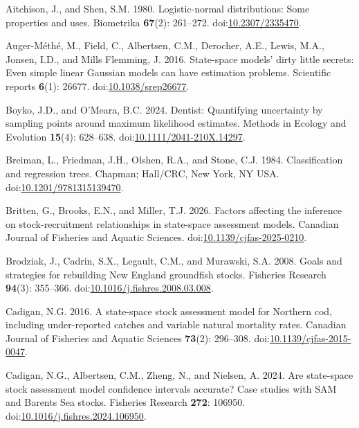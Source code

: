\documentclass[
  12pt,
]{article}
\newlength{\cslhangindent}
\newenvironment{CSLReferences}[2] %
 {\begin{list}{}{%
  \setlength{\itemindent}{0pt}
  \setlength{\leftmargin}{0pt}
  \setlength{\parsep}{0pt}
  \ifodd #1
   \setlength{\leftmargin}{\cslhangindent}
   \setlength{\itemindent}{-1\cslhangindent}
  \fi
  \setlength{\itemsep}{#2\baselineskip}}}
 {\end{list}}
\begin{document}
\protect{}\label{refs}
\begin{CSLReferences}{1}{0}
Aitchison, J., and Shen, S.M. 1980. Logistic-normal distributions: Some
properties and uses. Biometrika \textbf{67}(2): 261--272.
doi:\href{https://doi.org/10.2307/2335470}{10.2307/2335470}.

Auger-Méthé, M., Field, C., Albertsen, C.M., Derocher, A.E., Lewis,
M.A., Jonsen, I.D., and Mills Flemming, J. 2016. State-space models'
dirty little secrets: Even simple linear {G}aussian models can have
estimation problems. Scientific reports \textbf{6}(1): 26677.
doi:\href{https://doi.org/10.1038/srep26677}{10.1038/srep26677}.

Boyko, J.D., and O'Meara, B.C. 2024. Dentist: Quantifying uncertainty by
sampling points around maximum likelihood estimates. Methods in Ecology
and Evolution \textbf{15}(4): 628--638.
doi:\href{https://doi.org/10.1111/2041-210X.14297}{10.1111/2041-210X.14297}.

Breiman, L., Friedman, J.H., Olshen, R.A., and Stone, C.J. 1984.
Classification and regression trees. Chapman; Hall/CRC, New York, NY
USA.
doi:\href{https://doi.org/10.1201/9781315139470}{10.1201/9781315139470}.

Britten, G., Brooks, E.N., and Miller, T.J. 2026. Factors affecting the
inference on stock-recruitment relationships in state-space assessment
models. Canadian Journal of Fisheries and Aquatic Sciences.
doi:\href{https://doi.org/10.1139/cjfas-2025-0210}{10.1139/cjfas-2025-0210}.

Brodziak, J., Cadrin, S.X., Legault, C.M., and Murawski, S.A. 2008.
Goals and strategies for rebuilding {N}ew {E}ngland groundfish stocks.
Fisheries Research \textbf{94}(3): 355--366.
doi:\href{https://doi.org/10.1016/j.fishres.2008.03.008}{10.1016/j.fishres.2008.03.008}.

Cadigan, N.G. 2016. A state-space stock assessment model for {N}orthern
cod, including under-reported catches and variable natural mortality
rates. Canadian Journal of Fisheries and Aquatic Sciences
\textbf{73}(2): 296--308.
doi:\href{https://doi.org/10.1139/cjfas-2015-0047}{10.1139/cjfas-2015-0047}.

Cadigan, N.G., Albertsen, C.M., Zheng, N., and Nielsen, A. 2024. Are
state-space stock assessment model confidence intervals accurate? {C}ase
studies with {SAM} and {B}arents {S}ea stocks. Fisheries Research
\textbf{272}: 106950.
doi:\href{https://doi.org/10.1016/j.fishres.2024.106950}{10.1016/j.fishres.2024.106950}.


\end{CSLReferences}
\end{document}
